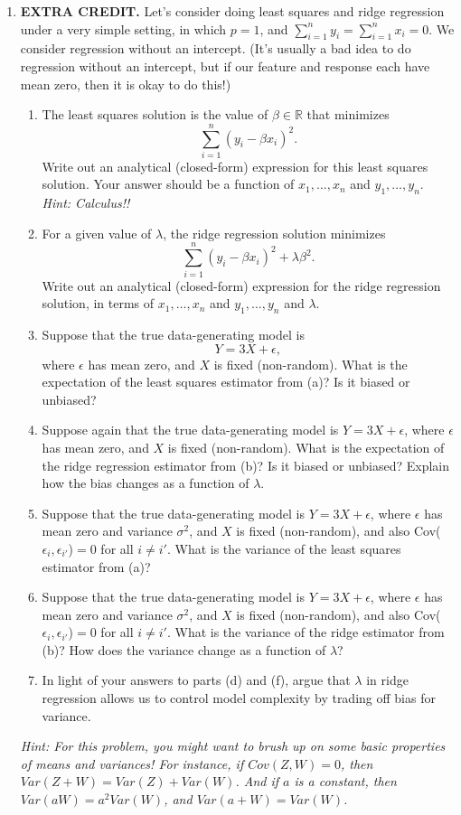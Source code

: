 \documentclass[12pt]{article}
\begin{document}
\begin{enumerate}
\item {\bf EXTRA CREDIT.} Let's consider doing least squares and ridge regression under a very simple setting, in which $p=1$, and $\sum_{i=1}^n y_i = \sum_{i=1}^n x_i = 0$. We consider regression without an intercept. 
(It's usually a bad idea to do regression without an intercept, but if our feature and response each have mean zero, then it is okay to do this!)

\begin{enumerate}
\item The least squares solution is the value of $\beta \in \mathbb{R}$ that minimizes
$$\sum_{i=1}^n (y_i - \beta x_i)^2.$$ Write out an analytical (closed-form) expression for this least squares solution. Your answer should be a function of $x_1,\ldots,x_n$ and $y_1,\ldots,y_n$.\\
\emph{Hint: Calculus!!}
\item For a given value of $\lambda$, the ridge regression solution minimizes $$\sum_{i=1}^n (y_i - \beta x_i)^2 + \lambda \beta^2.$$ Write out an analytical (closed-form) expression for the ridge regression solution, in terms of $x_1,\ldots,x_n$ and $y_1,\ldots,y_n$ and $\lambda$.
\item Suppose that the true data-generating model is $$Y = 3 X + \epsilon,$$ where $\epsilon$ has mean zero, and $X$ is fixed (non-random). What is the expectation of the least squares estimator from (a)? Is it biased or unbiased?  
\item Suppose again that the true data-generating model is $Y = 3 X + \epsilon$, where $\epsilon$ has mean zero, and $X$ is fixed (non-random). What is the expectation of the ridge regression estimator from (b)? Is it biased or unbiased? Explain how the bias changes as a function of $\lambda$. 
\item Suppose that the true data-generating model is $Y = 3 X + \epsilon$, where $\epsilon$ has mean zero and variance $\sigma^2$, and $X$ is fixed (non-random), and also Cov($\epsilon_i, \epsilon_{i'}$)$=0$ for all $i \neq i'$. What is the variance of the least squares estimator from (a)? 
\item Suppose that the true data-generating model is $Y = 3 X + \epsilon$, where $\epsilon$ has mean zero and variance $\sigma^2$, and $X$ is fixed (non-random), and also Cov($\epsilon_i, \epsilon_{i'}$)$=0$ for all $i \neq i'$. What is the variance of the ridge estimator from (b)? How does the variance change  as a function of $\lambda$? 
\item In light of your answers to parts (d) and (f), argue that $\lambda$ in ridge regression allows us to control model complexity by trading off bias for variance.
\end{enumerate}
\emph{Hint: For this problem, you might want to brush up on some basic properties of means and variances! For instance, if $Cov(Z,W)=0$, then $Var(Z+W)=Var(Z)+Var(W)$. And if $a$ is a constant, then $Var(aW) = a^2 Var(W)$, and $Var(a+W)=Var(W)$.}




 
\end{enumerate}
\end{document}
